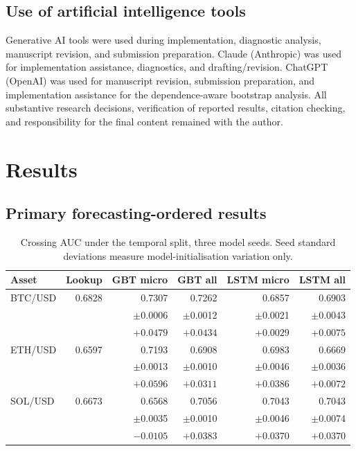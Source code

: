 \documentclass[11pt]{article}
\begin{document}
\subsection{Use of artificial intelligence tools}
Generative AI tools were used during implementation, diagnostic analysis, manuscript revision, and submission preparation. Claude (Anthropic) was used for implementation assistance, diagnostics, and drafting/revision. ChatGPT (OpenAI) was used for manuscript revision, submission preparation, and implementation assistance for the dependence-aware bootstrap analysis. All substantive research decisions, verification of reported results, citation checking, and responsibility for the final content remained with the author.

\section{Results}
\subsection{Primary forecasting-ordered results}
\begin{table}[ht]
\centering
\caption{Crossing AUC under the temporal split, three model seeds. Seed standard deviations measure model-initialisation variation only.}
\small
\begin{tabular}{lrrrrr}
\toprule
Asset & Lookup & GBT micro & GBT all & LSTM micro & LSTM all \\
\midrule
BTC/USD & 0.6828 & 0.7307 & 0.7262 & 0.6857 & 0.6903 \\
& & \tiny$\pm$0.0006 & \tiny$\pm$0.0012 & \tiny$\pm$0.0021 & \tiny$\pm$0.0043 \\
& & $+0.0479$ & $+0.0434$ & $+0.0029$ & $+0.0075$ \\
\addlinespace
ETH/USD & 0.6597 & 0.7193 & 0.6908 & 0.6983 & 0.6669 \\
& & \tiny$\pm$0.0013 & \tiny$\pm$0.0010 & \tiny$\pm$0.0046 & \tiny$\pm$0.0036 \\
& & $+0.0596$ & $+0.0311$ & $+0.0386$ & $+0.0072$ \\
\addlinespace
SOL/USD & 0.6673 & 0.6568 & 0.7056 & 0.7043 & 0.7043 \\
& & \tiny$\pm$0.0035 & \tiny$\pm$0.0010 & \tiny$\pm$0.0046 & \tiny$\pm$0.0074 \\
& & $-0.0105$ & $+0.0383$ & $+0.0370$ & $+0.0370$ \\
\bottomrule
\end{tabular}
\end{table}
\end{document}
